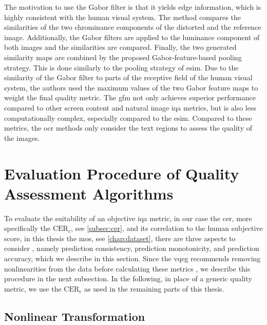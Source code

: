 The motivation to use the Gabor filter is that it yields edge information, which is highly consistent with the human visual system.
The method compares the similarities of the two chrominance components of the distorted and the reference image.
Additionally, the Gabor filters are applied to the luminance component of both images and the similarities are compared.
Finally, the two generated similarity maps are combined by the proposed Gabor-feature-based pooling strategy.
This is done similarly to the pooling strategy of \gls{esim}.
Due to the similarity of the Gabor filter to parts of the receptive field of the human visual system, the authors used the maximum values of the two Gabor feature maps to weight the final quality metric.
The \gls{gfm} not only achieves superior performance compared to other screen content and natural image \gls{iqa} metrics, but is also less computationally complex, especially compared to the \gls{esim}.
Compared to these metrics, the \gls{ocr} methods only consider the text regions to assess the quality of the images.



\section{Evaluation Procedure of Quality Assessment Algorithms}
\label{sec:evalprocedure}

To evaluate the suitability of an objective \gls{iqa} metric, in our case the \gls{cer}, more specifically the $\text{CER}_{\text{c}}$, see \autoref{subsec:cer}, and its correlation to the human subjective score, in this thesis the \gls{mos}, see \autoref{chap:dataset}, there are three aspects to consider \cite{nonlin_fit_original_2003}\cite{iqa_survey_2020}, namely prediction consistency, prediction monotonicity, and prediction accuracy, which we describe in this section.
Since the \gls{vqeg} recommends removing nonlinearities from the data before calculating these metrics \cite{nonlin_fit_original_2003}, we describe this procedure in the next subsection.
In the following, in place of a generic quality metric, we use the $\text{CER}_{\text{c}}$ as used in the remaining parts of this thesis.

\subsection{Nonlinear Transformation}
\label{subsec:nonlinear}

